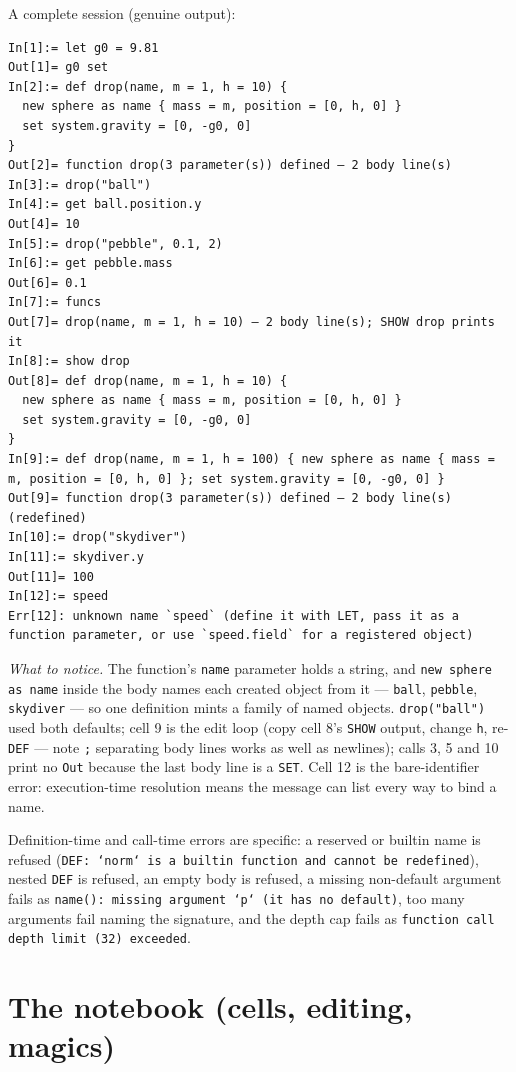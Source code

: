\documentclass[11pt]{article}
\newcommand{\kw}[1]{\texttt{\uppercase{#1}}}
\newcommand{\code}[1]{\texttt{#1}}
\begin{document}
A complete session (genuine output):

\begin{lstlisting}
In[1]:= let g0 = 9.81
Out[1]= g0 set
In[2]:= def drop(name, m = 1, h = 10) {
  new sphere as name { mass = m, position = [0, h, 0] }
  set system.gravity = [0, -g0, 0]
}
Out[2]= function drop(3 parameter(s)) defined — 2 body line(s)
In[3]:= drop("ball")
In[4]:= get ball.position.y
Out[4]= 10
In[5]:= drop("pebble", 0.1, 2)
In[6]:= get pebble.mass
Out[6]= 0.1
In[7]:= funcs
Out[7]= drop(name, m = 1, h = 10) — 2 body line(s); SHOW drop prints it
In[8]:= show drop
Out[8]= def drop(name, m = 1, h = 10) {
  new sphere as name { mass = m, position = [0, h, 0] }
  set system.gravity = [0, -g0, 0]
}
In[9]:= def drop(name, m = 1, h = 100) { new sphere as name { mass = m, position = [0, h, 0] }; set system.gravity = [0, -g0, 0] }
Out[9]= function drop(3 parameter(s)) defined — 2 body line(s) (redefined)
In[10]:= drop("skydiver")
In[11]:= skydiver.y
Out[11]= 100
In[12]:= speed
Err[12]: unknown name `speed` (define it with LET, pass it as a function parameter, or use `speed.field` for a registered object)
\end{lstlisting}

\emph{What to notice.} The function's \code{name} parameter holds a
string, and \code{new sphere as name} inside the body names each
created object from it --- \code{ball}, \code{pebble},
\code{skydiver} --- so one definition mints a family of named
objects. \code{drop("ball")} used both defaults; cell 9 is the edit
loop (copy cell 8's \kw{show} output, change \code{h}, re-\kw{def}
--- note \code{;} separating body lines works as well as newlines);
calls 3, 5 and 10 print no \code{Out} because the last body line is a
\kw{set}. Cell 12 is the bare-identifier error: execution-time
resolution means the message can list every way to bind a name.

Definition-time and call-time errors are specific: a reserved or
builtin name is refused (\code{DEF: `norm` is a builtin function and
cannot be redefined}), nested \kw{def} is refused, an empty body is
refused, a missing non-default argument fails as
\code{name(): missing argument `p` (it has no default)}, too many
arguments fail naming the signature, and the depth cap fails as
\code{function call depth limit (32) exceeded}.

\section{The notebook (cells, editing, magics)}
\end{document}
